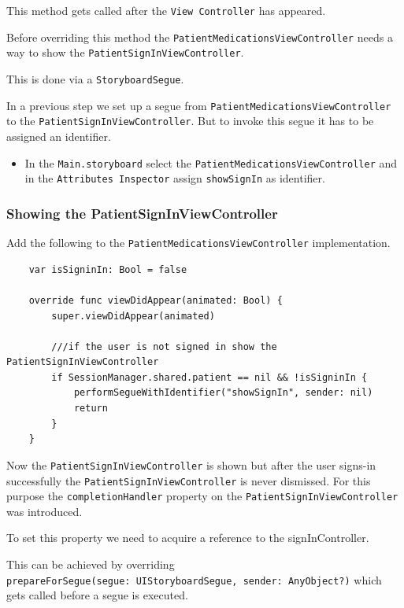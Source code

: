 \documentclass{article}
\begin{document}
This method gets called after the \texttt{View\ Controller} has
appeared.

Before overriding this method the
\texttt{PatientMedicationsViewController} needs a way to show the
\texttt{PatientSignInViewController}.

This is done via a \texttt{StoryboardSegue}.

In a previous step we set up a segue from
\texttt{PatientMedicationsViewController} to the
\texttt{PatientSignInViewController}. But to invoke this segue it has to
be assigned an identifier.

\begin{itemize}

\item
  In the \texttt{Main.storyboard} select the
  \texttt{PatientMedicationsViewController} and in the
  \texttt{Attributes\ Inspector} assign \texttt{showSignIn} as
  identifier.
\end{itemize}

\subsubsection{Showing the PatientSignInViewController}\label{overriding-viewdidappear}

Add the following to the \texttt{PatientMedicationsViewController}
implementation.

\begin{verbatim}
    var isSigninIn: Bool = false

    override func viewDidAppear(animated: Bool) {
        super.viewDidAppear(animated)

        ///if the user is not signed in show the PatientSignInViewController
        if SessionManager.shared.patient == nil && !isSigninIn {
            performSegueWithIdentifier("showSignIn", sender: nil)
            return
        }
    }
\end{verbatim}
Now the \texttt{PatientSignInViewController} is shown but after the user
signs-in successfully the \texttt{PatientSignInViewController} is never
dismissed. For this purpose the \texttt{completionHandler} property on
the \texttt{PatientSignInViewController} was introduced.

To set this property we need to acquire a reference to the
signInController.

This can be achieved by overriding
\texttt{prepareForSegue(segue:\ UIStoryboardSegue,\ sender:\ AnyObject?)}
which gets called before a segue is executed.
\end{document}
